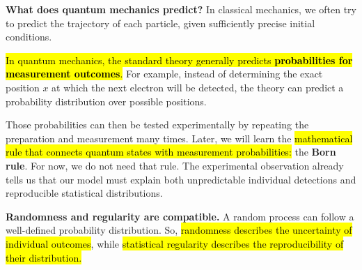 \newpage

\noindent
\textcolor{Green3}{ \textbf{What does quantum mechanics predict?}} In classical mechanics, we often try to predict the trajectory of each particle, given sufficiently precise initial conditions.

\highspace
\hl{In quantum mechanics, the standard theory generally predicts \textbf{probabilities for measurement outcomes}.}
For example, instead of determining the exact position $x$ at which the next electron will be detected, the theory can predict a probability distribution over possible positions.

\highspace
Those probabilities can then be tested experimentally by repeating the preparation and measurement many times.
Later, we will learn the \hl{mathematical rule that connects quantum states with measurement probabilities:} the \textbf{Born rule}.
For now, we do not need that rule. The experimental observation already tells us that our model must explain both unpredictable individual detections and reproducible statistical distributions.

\highspace
\textcolor{Green3}{ \textbf{Randomness and regularity are compatible.}} A random process can follow a well-defined probability distribution. So, \hl{randomness describes the uncertainty of individual outcomes}, while \hl{statistical regularity describes the reproducibility of their distribution.}
\begin{center}
\end{center}

